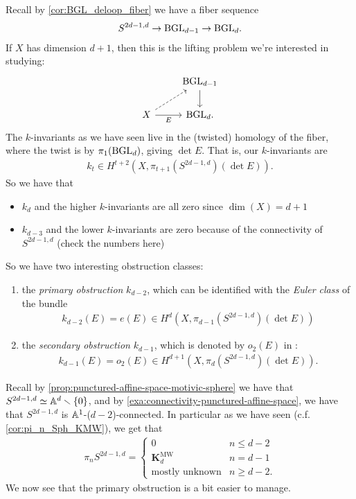 \documentclass[11pt,openany]{book}
\providecommand{\KMW}{\mathbf{K}^\mathrm{MW}}
\begin{document}
Recall by \autoref{cor:BGL_deloop_fiber} we have a fiber sequence
\begin{align*}
    S^{2d-1,d} \to \mathrm{BGL}_{d-1} \to \mathrm{BGL}_d.
\end{align*}
If $X$ has dimension $d+1$, then this is the lifting problem we're interested in studying:
\[ \begin{tikzcd}
     & \BGL_{d-1}\dar\\
    X\rar["E" below]\ar[ur,dashed] & \BGL_d.
\end{tikzcd} \]
%
The $k$-invariants as we have seen live in the (twisted) homology of the fiber, where the twist is by $\pi_1(\mathrm{BGL}_d)$, giving $\det E$. That is, our $k$-invariants are
\begin{align*}
    k_t \in H^{t+2}(X,\pi_{t+1}(S^{2d-1,d})(\det E)).
\end{align*}
%
So we have that
\begin{itemize}
    \item $k_d$ and the higher $k$-invariants are all zero since $\dim(X) = d+1$
    \item $k_{d-3}$ and the lower $k$-invariants are zero because of the connectivity of $S^{2d-1,d}$ (\todo check the numbers here)
\end{itemize}
So we have two interesting obstruction classes:
\begin{enumerate}
    \item the \textit{primary obstruction} $k_{d-2}$, which can be identified with the \textit{Euler class} of the bundle
    \begin{align*}
        k_{d-2}(E) = e(E) \in H^d(X,\pi_{d-1}(S^{2d-1,d})(\det E))
    \end{align*}
    \item the \textit{secondary obstruction} $k_{d-1}$, which is denoted by $o_2(E)$ in \cite{Freudenthal}:
    \begin{align*}
        k_{d-1}(E) = o_2(E) \in H^{d+1}(X,\pi_{d}(S^{2d-1,d})(\det E)).
    \end{align*}
\end{enumerate}
Recall by \autoref{prop:punctured-affine-space-motivic-sphere} we have that $S^{2d-1,d}\simeq \mathbb{A}^d\smallsetminus\{0\}$, and by \autoref{exa:connectivity-punctured-affine-space}, we have that $S^{2d-1,d}$ is $\mathbb{A}^1$-($d-2$)-connected. In particular as we have seen (c.f. \autoref{cor:pi_n_Sph_KMW}), we get that
\begin{align*}
    \pi_n S^{2d-1,d} = \begin{cases} 0 & n\le d-2 \\ \KMW_d & n=d-1 \\ \text{mostly unknown} & n\ge d-2.\end{cases}
\end{align*}
We now see that the primary obstruction is a bit easier to manage.
\end{document}
